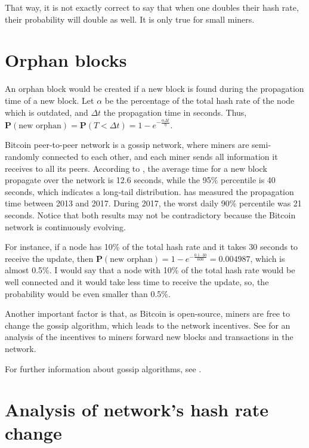 That way, it is not exactly correct to say that when one doubles their hash rate, their probability will double as well. It is only true for small miners.


\section{Orphan blocks}
An orphan block would be created if a new block is found during the propagation time of a new block. Let $\alpha$ be the percentage of the total hash rate of the node which is outdated, and $\Delta t$ the propagation time in seconds. Thus, $\mathbf{P}(\text{new orphan}) = \mathbf{P}(T < \Delta t) = 1 - e^{-\frac{\alpha \Delta t}{\eta}}$.

Bitcoin peer-to-peer network is a gossip network, where miners are semi-randomly connected to each other, and each miner sends all information it receives to all its peers. According to \citet{decker2013information}, the average time for a new block propagate over the network is 12.6 seconds, while the 95\% percentile is 40 seconds, which indicates a long-tail distribution. \citet{bitcoinstats} has measured the propagation time between 2013 and 2017. During 2017, the worst daily 90\% percentile was 21 seconds. Notice that both results may not be contradictory because the Bitcoin network is continuously evolving.

For instance, if a node has 10\% of the total hash rate and it takes 30 seconds to receive the update, then $\mathbf{P}(\text{new orphan}) = 1 - e^{-\frac{0.1 \cdot 30}{600}} = 0.004987$, which is almost 0.5\%. I would say that a node with 10\% of the total hash rate would be well connected and it would take less time to receive the update, so, the probability would be even smaller than 0.5\%.

Another important factor is that, as Bitcoin is open-source, miners are free to change the gossip algorithm, which leads to the network incentives. See \citet{babaioff2012bitcoin} for an analysis of the incentives to miners forward new blocks and transactions in the network.

For further information about gossip algorithms, see \citet{shah2009gossip}.


\section{Analysis of network's hash rate change}

